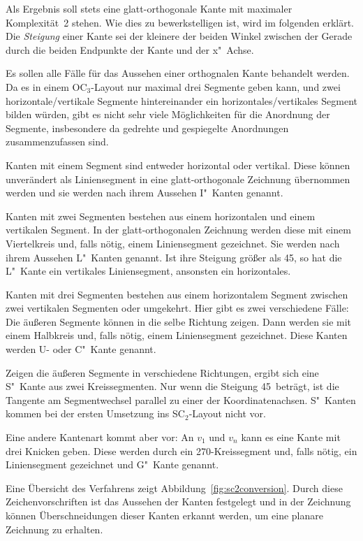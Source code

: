 \documentclass[a4paper]{scrreprt}
\theoremstyle{definition}
\begin{document}
Als Ergebnis soll stets eine glatt-orthogonale Kante mit maximaler Komplexität~2 stehen. Wie dies zu bewerkstelligen ist, wird im folgenden erklärt. Die \emph{Steigung} einer Kante sei der kleinere der beiden Winkel zwischen der Gerade durch die beiden Endpunkte der Kante und der x"~Achse.

Es sollen alle Fälle für das Aussehen einer orthognalen Kante behandelt werden. Da es in einem OC$_3$-Layout nur maximal drei Segmente geben kann, und zwei horizontale/vertikale Segmente hintereinander ein horizontales/vertikales Segment bilden würden, gibt es nicht sehr viele Möglichkeiten für die Anordnung der Segmente, insbesondere da gedrehte und gespiegelte Anordnungen zusammenzufassen sind.

Kanten mit einem Segment sind entweder horizontal oder vertikal. Diese können unverändert als Liniensegment in eine glatt-orthogonale Zeichnung übernommen werden und sie werden nach ihrem Aussehen I"~Kanten genannt.

Kanten mit zwei Segmenten bestehen aus einem horizontalen und einem vertikalen Segment. In der glatt-orthogonalen Zeichnung werden diese mit einem Viertelkreis und, falls nötig, einem Liniensegment gezeichnet. Sie werden nach ihrem Aussehen L"~Kanten genannt. Ist ihre Steigung größer als 45\textdegree, so hat die L"~Kante ein vertikales Liniensegment, ansonsten ein horizontales.

Kanten mit drei Segmenten bestehen aus einem horizontalem Segment zwischen zwei vertikalen Segmenten oder umgekehrt. Hier gibt es zwei verschiedene Fälle: Die äußeren Segmente können in die selbe Richtung zeigen. Dann werden sie mit einem Halbkreis und, falls nötig, einem Liniensegment gezeichnet. Diese Kanten werden U- oder C"~Kante genannt.

Zeigen die äußeren Segmente in verschiedene Richtungen, ergibt sich eine S"~Kante aus zwei Kreissegmenten. Nur wenn die Steigung 45\textdegree\ beträgt, ist die Tangente am Segmentwechsel parallel zu einer der Koordinatenachsen. S"~Kanten kommen bei der ersten Umsetzung ins SC$_2$-Layout nicht vor.

Eine andere Kantenart kommt aber vor: An $v_1$ und $v_n$ kann es eine Kante mit drei Knicken geben. Diese werden durch ein 270\textdegree-Kreissegment und, falls nötig, ein Liniensegment gezeichnet und G"~Kante genannt.

Eine Übersicht des Verfahrens zeigt Abbildung~\ref{fig:sc2conversion}. Durch diese Zeichenvorschriften ist das Aussehen der Kanten festgelegt und in der Zeichnung können Überschneidungen dieser Kanten erkannt werden, um eine planare Zeichnung zu erhalten.
\end{document}
